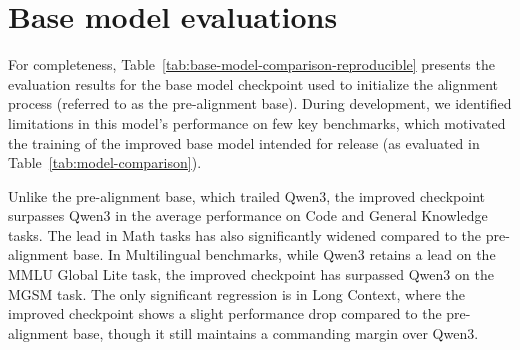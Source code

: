 \appendix

\section{Base model evaluations}
\label{appendix:v0_base_model_evals}

For completeness, Table~\ref{tab:base-model-comparison-reproducible} presents the evaluation results for the base model checkpoint used to initialize the alignment process (referred to as the pre-alignment base). During development, we identified limitations in this model's performance on few key benchmarks, which motivated the training of the improved base model intended for release (as evaluated in Table~\ref{tab:model-comparison}).

Unlike the pre-alignment base, which trailed Qwen3, the improved checkpoint surpasses Qwen3 in the average performance on Code and General Knowledge tasks. The lead in Math tasks has also significantly widened compared to the pre-alignment base. In Multilingual benchmarks, while Qwen3 retains a lead on the MMLU Global Lite task, the improved checkpoint has surpassed Qwen3 on the MGSM task. The only significant regression is in Long Context, where the improved checkpoint shows a slight performance drop compared to the pre-alignment base, though it still maintains a commanding margin over Qwen3.




